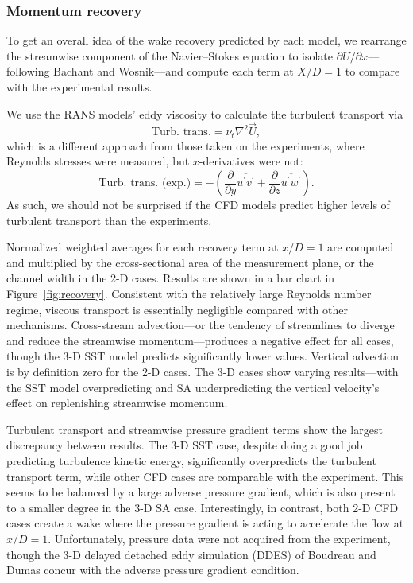\documentclass[aip,graphicx]{revtex4-1}
\begin{document}
\subsubsection{Momentum recovery}

To get an overall idea of the wake recovery predicted by each model, we
rearrange the streamwise component of the Navier--Stokes equation to isolate
$\partial U / \partial x$---following Bachant and
Wosnik\cite{Bachant2015-JoT}---and compute each term at $X/D = 1$ to compare
with the experimental results.

We use the RANS models' eddy viscosity to calculate the turbulent transport via
\begin{equation}
    \text{Turb. trans.} = \nu_t \nabla^2 \vec{U},
    \label{eq:turb-trans}
\end{equation}
which is a different approach from those taken on the experiments, where Reynolds stresses were measured, but $x$-derivatives were not:
\begin{equation}
    \text{Turb. trans. (exp.)} = 
    -\left( 
    \frac{\partial}{\partial y} \overline{u^\prime v^\prime}
    +
    \frac{\partial}{\partial z} \overline{u^\prime w^\prime}
    \right).
\end{equation}
As such, we should not be surprised if the CFD models predict higher levels of
turbulent transport than the experiments.

Normalized weighted averages for each recovery term at $x/D=1$ are computed and
multiplied by the cross-sectional area of the measurement plane, or the channel
width in the 2-D cases. Results are shown in a bar chart in
Figure~\ref{fig:recovery}. Consistent with the relatively large Reynolds number
regime, viscous transport is essentially negligible compared with other
mechanisms. Cross-stream advection---or the tendency of streamlines to diverge
and reduce the streamwise momentum---produces a negative effect for all cases,
though the 3-D SST model predicts significantly lower values. Vertical advection
is by definition zero for the 2-D cases. The 3-D cases show varying
results---with the SST model overpredicting and SA underpredicting the vertical
velocity's effect on replenishing streamwise momentum.

Turbulent transport and streamwise pressure gradient terms show the largest
discrepancy between results. The 3-D SST case, despite doing a good job
predicting turbulence kinetic energy, significantly overpredicts the turbulent
transport term, while other CFD cases are comparable with the experiment. This
seems to be balanced by a large adverse pressure gradient, which is also present
to a smaller degree in the 3-D SA case. Interestingly, in contrast, both 2-D CFD
cases create a wake where the pressure gradient is acting to accelerate the flow
at $x/D=1$. Unfortunately, pressure data were not acquired from the experiment,
though the 3-D delayed detached eddy simulation (DDES) of Boudreau and Dumas
\cite{Boudreau2015} concur with the adverse pressure gradient condition.
\end{document}
